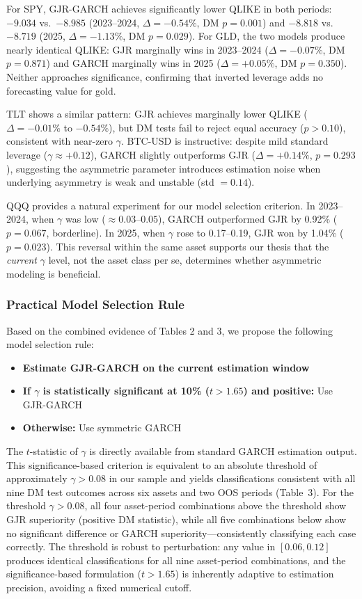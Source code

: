 For SPY, GJR-GARCH achieves significantly lower QLIKE in both periods: $-9.034$ vs.\ $-8.985$ (2023--2024, $\Delta = -0.54\%$, DM $p = 0.001$) and $-8.818$ vs.\ $-8.719$ (2025, $\Delta = -1.13\%$, DM $p = 0.029$). For GLD, the two models produce nearly identical QLIKE: GJR marginally wins in 2023--2024 ($\Delta = -0.07\%$, DM $p = 0.871$) and GARCH marginally wins in 2025 ($\Delta = +0.05\%$, DM $p = 0.350$). Neither approaches significance, confirming that inverted leverage adds no forecasting value for gold.

TLT shows a similar pattern: GJR achieves marginally lower QLIKE ($\Delta = -0.01\%$ to $-0.54\%$), but DM tests fail to reject equal accuracy ($p > 0.10$), consistent with near-zero $\gamma$. BTC-USD is instructive: despite mild standard leverage ($\gamma \approx +0.12$), GARCH slightly outperforms GJR ($\Delta = +0.14\%$, $p = 0.293$), suggesting the asymmetric parameter introduces estimation noise when underlying asymmetry is weak and unstable (std $= 0.14$).

QQQ provides a natural experiment for our model selection criterion. In 2023--2024, when $\gamma$ was low ($\approx 0.03$--$0.05$), GARCH outperformed GJR by 0.92\% ($p = 0.067$, borderline). In 2025, when $\gamma$ rose to 0.17--0.19, GJR won by 1.04\% ($p = 0.023$). This reversal within the same asset supports our thesis that the \textit{current} $\gamma$ level, not the asset class per se, determines whether asymmetric modeling is beneficial.

\subsubsection{Practical Model Selection Rule}

Based on the combined evidence of Tables 2 and 3, we propose the following model selection rule:
\begin{itemize}
\item \textbf{Estimate GJR-GARCH on the current estimation window}
\item \textbf{If $\gamma$ is statistically significant at 10\% ($t > 1.65$) and positive:} Use GJR-GARCH
\item \textbf{Otherwise:} Use symmetric GARCH
\end{itemize}
The $t$-statistic of $\gamma$ is directly available from standard GARCH estimation output. This significance-based criterion is equivalent to an absolute threshold of approximately $\gamma > 0.08$ in our sample and yields classifications consistent with all nine DM test outcomes across six assets and two OOS periods (Table~3). For the threshold $\gamma > 0.08$, all four asset-period combinations above the threshold show GJR superiority (positive DM statistic), while all five combinations below show no significant difference or GARCH superiority---consistently classifying each case correctly. The threshold is robust to perturbation: any value in $[0.06, 0.12]$ produces identical classifications for all nine asset-period combinations, and the significance-based formulation ($t > 1.65$) is inherently adaptive to estimation precision, avoiding a fixed numerical cutoff.

